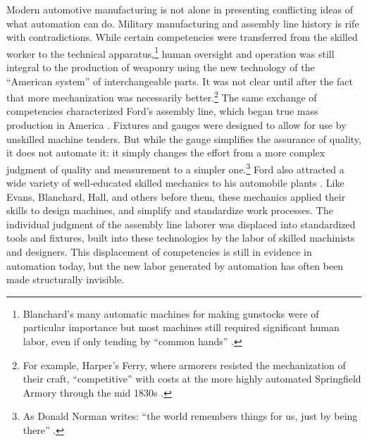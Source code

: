 

Modern automotive manufacturing is not alone in presenting conflicting ideas
of what automation can do. Military manufacturing and assembly line
history is rife with contradictions. While certain competencies were
transferred from the skilled worker
to the technical apparatus,\footnote{Blanchard's many automatic
  machines for making gunstocks were of particular
  importance \cite[p. 56]{roesmithHarpers} but most
 machines still required significant human labor, even if only tending
 by ``common
 hands'' \cite[p. 239]{roesmithHarpers}.} human oversight and operation was still
integral to the production of weaponry using the new technology of the
``American system'' of interchangeable parts. It was
not clear until after the fact that more mechanization was necessarily
better.\footnote{For example, Harper's Ferry, where armorers resisted the
  mechanization of their craft, ``competitive'' with
costs at the more highly automated Springfield Armory through the mid
1830s \cite[p. 324]{roesmithHarpers}.} The same exchange of
competencies characterized Ford's assembly line, which began
true mass production in America \cite[p. 217]{hounshell}. Fixtures
and gauges were designed to allow for use by unskilled machine
tenders.
 But while the gauge simplifies the
assurance  of quality, it does not
automate it:  it simply changes the effort from a more complex judgment
of quality and measurement to a simpler one.\footnote{As Donald
Norman writes: ``the world remembers things for us, just by being
there'' \cite[p. 147]{normanThings}.} Ford also attracted a wide
variety of well-educated skilled mechanics 
to his automobile plants \cite[p. 223]{hounshell}. Like Evans, Blanchard, Hall, and others
before them, these mechanics applied their skills to design machines,
and simplify and standardize work processes. The individual judgment
of the assembly line laborer was displaced into standardized tools and
fixtures, built into these technologies by the labor of skilled
machinists and designers. This displacement of competencies is still in
evidence in automation today, but the new labor generated by automation
has often
been made structurally invisible.

